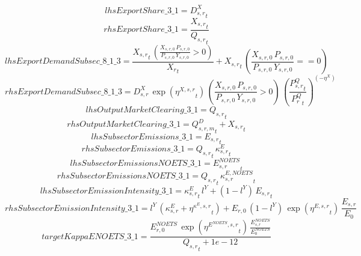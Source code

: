 \begin{dmath*}
lhsExportShare\_3\_1 = {{D^{X}_{s,r}}}_{t}
\end{dmath*}
\begin{dmath*}
rhsExportShare\_3\_1 = \frac{{{X_{s,r}}}_{t}}{{{Q_{s,r}}}_{t}}
\end{dmath*}
\begin{dmath*}
lhsExportDemandSubsec\_8\_1\_3 = \frac{{{X_{s,r}}}_{t}\, \left({\frac{X_{s,r,0} \, P_{s,r,0}}{P_{s,r,0} \, Y_{s,r,0}}}>0\right)}{{{X_r}}_{t}}+{{X_{s,r}}}_{t}\, \left({\frac{X_{s,r,0} \, P_{s,r,0}}{P_{s,r,0} \, Y_{s,r,0}}}==0\right)
\end{dmath*}
\begin{dmath*}
rhsExportDemandSubsec\_8\_1\_3 = {{D^{X}_{s,r}}}\, \exp\left({{\eta^{X,s,r}}}_{t}\right)\, \left({\frac{X_{s,r,0} \, P_{s,r,0}}{P_{s,r,0} \, Y_{s,r,0}}}>0\right)\, \left(\frac{{{P^Q_{s,r}}}_{t}}{{{P^Q_{r}}}_{t}}\right)^{\left(-{{\eta^{X}}}\right)}
\end{dmath*}
\begin{dmath*}
lhsOutputMarketClearing\_3\_1 = {{Q_{s,r}}}_{t}
\end{dmath*}
\begin{dmath*}
rhsOutputMarketClearing\_3\_1 = {{Q^D_{s,r,m}}}_{t}+{{X_{s,r}}}_{t}
\end{dmath*}
\begin{dmath*}
lhsSubsectorEmissions\_3\_1 = {{E_{s,r}}}_{t}
\end{dmath*}
\begin{dmath*}
rhsSubsectorEmissions\_3\_1 = {{Q_{s,r}}}_{t}\, {{\kappa^{E}_{s,r}}}_{t}
\end{dmath*}
\begin{dmath*}
lhsSubsectorEmissionsNOETS\_3\_1 = {{E^{NOETS}_{s,r}}}_{t}
\end{dmath*}
\begin{dmath*}
rhsSubsectorEmissionsNOETS\_3\_1 = {{Q_{s,r}}}_{t}\, {{\kappa^{E,NOETS}_{s,r}}}_{t}
\end{dmath*}
\begin{dmath*}
lhsSubsectorEmissionIntensity\_3\_1 = {{\kappa^{E}_{s,r}}}_{t}\, {{l^{Y}}}+\left(1-{{l^{Y}}}\right)\, {{E_{s,r}}}_{t}
\end{dmath*}
\begin{dmath*}
rhsSubsectorEmissionIntensity\_3\_1 = {{l^{Y}}}\, \left({{\kappa^{E}_{s,r}}}+{{\eta^{\kappa^{E},s,r}}}_{t}\right)+{{E_{r,0}}}\, \left(1-{{l^{Y}}}\right)\, \exp\left({{\eta^{E,s,r}}}_{t}\right)\, {{\frac{E_{s,r}}{E_0}}}
\end{dmath*}
\begin{dmath*}
targetKappaENOETS\_3\_1 = \frac{{{E^{NOETS}_{r,0}}}\, \exp\left({{\eta^{E^{NOETS},s,r}}}_{t}\right)\, {{\frac{E^{NOETS}_{s,r}}{E^{NOETS}_0}}}}{{{Q_{s,r}}}_{t}+1e-12}
\end{dmath*}
